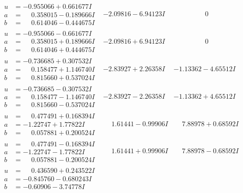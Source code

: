 \documentclass[1p]{elsarticle_modified}
\theoremstyle{definition}
\begin{document}
$$\begin{array}{c|c|c}
\begin{aligned}
u &= -0.955066 + 0.661677 I \\
a &= \phantom{-}0.358015 - 0.189666 I \\
b &= \phantom{-}0.614046 - 0.444675 I\end{aligned}
 & -2.09816 - 6.94123 I & \phantom{-0.000000 } 0 \\ \hline\begin{aligned}
u &= -0.955066 - 0.661677 I \\
a &= \phantom{-}0.358015 + 0.189666 I \\
b &= \phantom{-}0.614046 + 0.444675 I\end{aligned}
 & -2.09816 + 6.94123 I & \phantom{-0.000000 } 0 \\ \hline\begin{aligned}
u &= -0.736685 + 0.307532 I \\
a &= \phantom{-}0.158477 + 1.146740 I \\
b &= \phantom{-}0.815660 + 0.537024 I\end{aligned}
 & -2.83927 + 2.26358 I & -1.13362 - 4.65512 I \\ \hline\begin{aligned}
u &= -0.736685 - 0.307532 I \\
a &= \phantom{-}0.158477 - 1.146740 I \\
b &= \phantom{-}0.815660 - 0.537024 I\end{aligned}
 & -2.83927 - 2.26358 I & -1.13362 + 4.65512 I \\ \hline\begin{aligned}
u &= \phantom{-}0.477491 + 0.168394 I \\
a &= -1.22747 + 1.77822 I \\
b &= \phantom{-}0.057881 + 0.200524 I\end{aligned}
 & \phantom{-}1.61441 - 0.99906 I & \phantom{-}7.88978 + 0.68592 I \\ \hline\begin{aligned}
u &= \phantom{-}0.477491 - 0.168394 I \\
a &= -1.22747 - 1.77822 I \\
b &= \phantom{-}0.057881 - 0.200524 I\end{aligned}
 & \phantom{-}1.61441 + 0.99906 I & \phantom{-}7.88978 - 0.68592 I \\ \hline\begin{aligned}
u &= \phantom{-}0.436590 + 0.243522 I \\
a &= -0.845760 - 0.680243 I \\
b &= -0.60906 - 3.74778 I\end{aligned}

\end{array}$$
\end{document}
